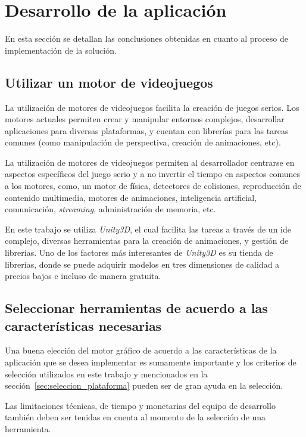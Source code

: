 
\section{Desarrollo de la aplicación}

En esta sección se detallan las conclusiones obtenidas en cuanto al proceso de
implementación de la solución.

\subsection{Utilizar un motor de videojuegos}

La utilización de motores de videojuegos facilita la creación de juegos serios.
Los motores actuales permiten crear y manipular entornos complejos, desarrollar
aplicaciones para diversas plataformas, y cuentan con librerías para las tareas
comunes (como manipulación de perspectiva, creación de animaciones, etc). 

La utilización de motores de videojuegos permiten al desarrollador centrarse en
aspectos específicos del juego serio y a no invertir el tiempo en aspectos
comunes a los motores, como, un motor de física, detectores de colisiones,
reproducción de contenido multimedia, motores de animaciones, inteligencia
artificial, comunicación, \textit{streaming}, administración de memoria, etc.

En este trabajo se utiliza \textit{Unity3D}, el cual facilita las tareas a
través de un \gls{ide} complejo, diversas herramientas para la creación de
animaciones, y gestión de librerías. Uno de los factores más interesantes de
\textit{Unity3D} es su tienda de librerías, donde se puede adquirir modelos en
tres dimensiones de calidad a precios bajos e incluso de manera gratuita.

\subsection{Seleccionar herramientas de acuerdo a las características necesarias}

Una buena elección del motor gráfico de acuerdo a las características de la
aplicación que se desea implementar es sumamente importante y los criterios de
selección utilizados en este trabajo y mencionados en la
sección~\ref{sec:seleccion_plataforma} pueden ser de gran ayuda en la selección.

Las limitaciones técnicas, de tiempo y monetarias del equipo de desarrollo
también deben ser tenidas en cuenta al momento de la selección de una
herramienta.

